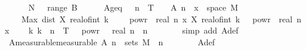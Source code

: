 \begin{isabellebody}
\ \ \ \ \isamarkupfalse%
\ {\isacharquery}{\kern0pt}N\ {\isacharequal}{\kern0pt}\ {\isachardoublequoteopen}{\isasymInter}\ {\isacharparenleft}{\kern0pt}range\ {\isacharquery}{\kern0pt}B{\isacharparenright}{\kern0pt}{\isachardoublequoteclose}\isanewline
\ \ \ \ \isamarkupfalse%
\ A{\isacharunderscore}{\kern0pt}geq{\isacharcolon}{\kern0pt}\ {\isachardoublequoteopen}{}\ {\isacharcircum}{\kern0pt}\ n\ {\isacharasterisk}{\kern0pt}\ T\ {\isasymge}\ {}\ {\isasymLongrightarrow}\ A\ n\ {\isacharequal}{\kern0pt}\ {\isacharbraceleft}{\kern0pt}x\ {\isasymin}\ space\ {\isacharquery}{\kern0pt}M{\isachardot}{\kern0pt}\ \isanewline
\ \ \ \ Max\ {\isacharbraceleft}{\kern0pt}dist\ {\isacharparenleft}{\kern0pt}X\ {\isacharparenleft}{\kern0pt}real{\isacharunderscore}{\kern0pt}of{\isacharunderscore}{\kern0pt}int\ {\isacharparenleft}{\kern0pt}k\ {\isacharminus}{\kern0pt}\ {}{\isacharparenright}{\kern0pt}\ {\isacharasterisk}{\kern0pt}\ {}\ powr\ {\isacharminus}{\kern0pt}\ real\ n{\isacharparenright}{\kern0pt}\ x{\isacharparenright}{\kern0pt}\ {\isacharparenleft}{\kern0pt}X\ {\isacharparenleft}{\kern0pt}real{\isacharunderscore}{\kern0pt}of{\isacharunderscore}{\kern0pt}int\ k\ {\isacharasterisk}{\kern0pt}\ {}\ powr\ {\isacharminus}{\kern0pt}\ real\ n{\isacharparenright}{\kern0pt}\ x{\isacharparenright}{\kern0pt}\isanewline
\ \ \ {\isacharbar}{\kern0pt}\ k{\isachardot}{\kern0pt}\ k\ {\isasymin}\ {\isacharbraceleft}{\kern0pt}{}{\isachardot}{\kern0pt}{\isachardot}{\kern0pt}{\isasymlfloor}{}{\isacharcircum}{\kern0pt}n\ {\isacharasterisk}{\kern0pt}\ T{\isasymrfloor}{\isacharbraceright}{\kern0pt}{\isacharbraceright}{\kern0pt}\ {\isasymge}\ {}\ powr\ {\isacharparenleft}{\kern0pt}{\isacharminus}{\kern0pt}{\isasymgamma}\ {\isacharasterisk}{\kern0pt}\ real\ n{\isacharparenright}{\kern0pt}{\isacharbraceright}{\kern0pt}{\isachardoublequoteclose}\ \ n\isanewline
\ \ \ \ \ \ \isamarkupfalse%
\ {\isacharparenleft}{\kern0pt}simp\ add{\isacharcolon}{\kern0pt}\ A{\isacharunderscore}{\kern0pt}def{\isacharparenright}{\kern0pt}\isanewline
\ \ \ \ \isamarkupfalse%
\ A{\isacharunderscore}{\kern0pt}measurable{\isacharbrackleft}{\kern0pt}measurable{\isacharbrackright}{\kern0pt}{\isacharcolon}{\kern0pt}\ {\isachardoublequoteopen}A\ n\ {\isasymin}\ sets\ {\isacharquery}{\kern0pt}M{\isachardoublequoteclose}\ \ n\isanewline
\ \ \ \ \ \ \isamarkupfalse%
\ A{\isacharunderscore}{\kern0pt}def\ \isamarkupfalse%

\end{isabellebody}
